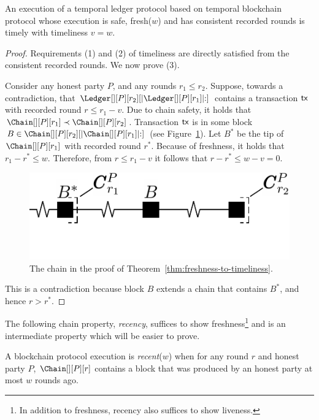 \begin{theorem} \label{thm:freshness-to-timeliness}
  An execution of a temporal ledger protocol based on
  temporal blockchain protocol
  whose execution is safe, fresh($w$) and has consistent recorded rounds is timely with timeliness $v = w$.
\end{theorem}
\begin{proof}
  Requirements (1) and (2) of timeliness are directly satisfied from
  the consistent recorded rounds.
  We now prove (3).

  Consider any honest party $P$, and any rounds $r_1 \leq r_2$.
  Suppose, towards a contradiction, that $\Ledger[][P][r_2][|\Ledger[][P][r_1]|{:}]$
  contains a transaction $\textsf{tx}$ with recorded round $r \leq r_1 - v$.
  Due to chain safety, it holds that $\Chain[][P][r_1] \prec \Chain[][P][r_2]$.
  Transaction $\textsf{tx}$ is in some block $B \in \Chain[][P][r_2][|\Chain[][P][r_1]|{:}]$
  (see Figure~\ref{fig:freshness-to-timeliness}).
  Let $B^*$ be the tip of $\Chain[][P][r_1]$ with recorded round $r^*$.
  Because of freshness, it holds that $r_1 - r^* \leq w$.
  Therefore, from $r \leq r_1 - v$ it follows that $r - r^* \leq w - v = 0$.

  \begin{figure}
    \centering
    \includegraphics[width=0.5\columnwidth,keepaspectratio]{figures/freshness-timeliness.pdf}
    \caption{The chain in the proof of Theorem~\ref{thm:freshness-to-timeliness}.}
    \label{fig:freshness-to-timeliness}
  \end{figure}

  This is a contradiction because block $B$ extends a chain that contains $B^*$,
  and hence $r > r^*$.
  \Qed
\end{proof}

The following chain property, \emph{recency}, suffices to show freshness\footnote{
  In addition to freshness, recency also suffices to show liveness.
} and is an intermediate property which will be easier to prove.

\begin{definition}[Recency]
  A blockchain protocol execution is \emph{recent}($w$)
  when for any round $r$ and honest party $P$, $\Chain[][P][r]$
  contains a block that was produced by an honest party
  at most $w$ rounds ago.
\end{definition}

